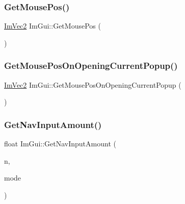 \mbox{\label{namespace_im_gui_abf11873349874c5d302861583c00d451}} 
\subsubsection{\texorpdfstring{Get\+Mouse\+Pos()}{GetMousePos()}}
{\footnotesize\ttfamily \mbox{\hyperlink{struct_im_vec2}{Im\+Vec2}} Im\+Gui\+::\+Get\+Mouse\+Pos (\begin{DoxyParamCaption}{ }\end{DoxyParamCaption})}

\mbox{\label{namespace_im_gui_ac1ba5d7b76e11d47660b32dc851afd2f}} 
\subsubsection{\texorpdfstring{Get\+Mouse\+Pos\+On\+Opening\+Current\+Popup()}{GetMousePosOnOpeningCurrentPopup()}}
{\footnotesize\ttfamily \mbox{\hyperlink{struct_im_vec2}{Im\+Vec2}} Im\+Gui\+::\+Get\+Mouse\+Pos\+On\+Opening\+Current\+Popup (\begin{DoxyParamCaption}{ }\end{DoxyParamCaption})}

\mbox{\label{namespace_im_gui_a468ab885f9d3bd81cc7e8c3608c05193}} 
\subsubsection{\texorpdfstring{Get\+Nav\+Input\+Amount()}{GetNavInputAmount()}}
{\footnotesize\ttfamily float Im\+Gui\+::\+Get\+Nav\+Input\+Amount (\begin{DoxyParamCaption}\item[{\mbox{\hyperlink{imgui_8h_a8334d2b3901efd9820b64e2413967469}{Im\+Gui\+Nav\+Input}}}]{n,  }\item[{\mbox{\hyperlink{imgui__internal_8h_a595aad51728e2685daff714edb3d05fd}{Im\+Gui\+Input\+Read\+Mode}}}]{mode }\end{DoxyParamCaption})}

